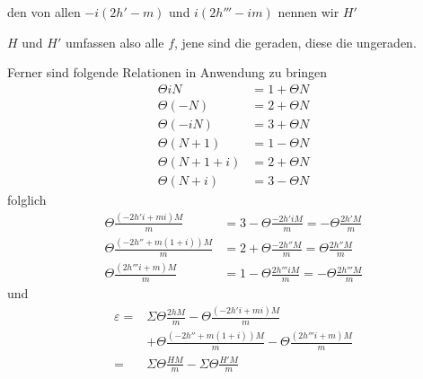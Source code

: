 den von allen $-i(2h'-m)$ und $i(2h'''-im)$ nennen wir $H'$

$H$ und $H'$ umfassen also alle $f$, jene sind die geraden, diese die ungeraden.

Ferner sind folgende Relationen in Anwendung zu bringen
\[
\begin{aligned}
\Theta iN&=1+\Theta N\\
\Theta(-N)&=2+\Theta N\\
\Theta(-iN)&=3+\Theta N\\
\Theta(N+1)&=1-\Theta N\\
\Theta(N+1+i)&=2+\Theta N\\
\Theta(N+i)&=3-\Theta N
\end{aligned}
\]
folglich
\[
\begin{aligned}
\Theta\frac{(-2h'i+mi)M}{m}&=3-\Theta\frac{-2h'iM}{m}=-\Theta\frac{2h'M}{m}\\
\Theta\frac{(-2h''+m(1+i))M}{m}&=2+\Theta\frac{-2h''M}{m}=\Theta\frac{2h''M}{m}\\
\Theta\frac{(2h'''i+m)M}{m}&=1-\Theta\frac{2h'''iM}{m}=-\Theta\frac{2h'''M}{m}
\end{aligned}
\]
und
\[
\begin{aligned}
\varepsilon={}&\Sigma\Theta\frac{2hM}{m}-\Theta\frac{(-2h'i+mi)M}{m}\\
&+\Theta\frac{(-2h''+m(1+i))M}{m}-\Theta\frac{(2h'''i+m)M}{m}\\
={}&\Sigma\Theta\frac{HM}{m}-\Sigma\Theta\frac{H'M}{m}
\end{aligned}
\]

